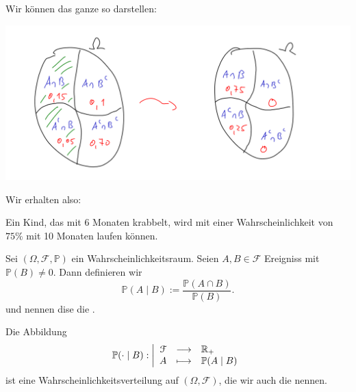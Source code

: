\begin{example}
    Wir können das ganze so darstellen: \\
    \begin{minipage}[t]{\textwidth}
        \centering
        \vspace{-2ex}
    \includegraphics[scale=0.2]{figures/Bedingte Wahrscheinlichkeit II.png}
    \vspace{2ex}
    \end{minipage}
    Wir erhalten also:
    \begin{answer}
        Ein Kind, das mit 6 Monaten krabbelt, wird mit einer Wahrscheinlichkeit von $75\%$ mit 10 Monaten laufen können.
    \end{answer}
\end{example}
\begin{definition}\label{def:bedingte-wahrscheinlichkeit}
    Sei $(\Omega, \mathcal{F}, \mathbb{P})$ ein Wahrscheinlichkeitsraum. Seien $A,B\in \mathcal{F}$ Ereigniss mit $\mathbb{P}(B) \neq  0$. Dann definieren wir
    \[
        \mathbb{P}(A \mid B) := \frac{\mathbb{P}(A\cap B)}{\mathbb{P}(B)}
    .\] 
    und nennen dise die . 
\end{definition}
\begin{remark}
       Die Abbildung
               \begin{equation*}
                   \mathbb{P}(\cdot \mid B): \left| \begin{array}{c c l} 
               \mathcal{F} & \longrightarrow & \mathbb{R}_+ \\
               A & \longmapsto &  \mathbb{P}(A\mid B)
               \end{array} \right.
           \end{equation*}
           ist eine Wahrscheinlichkeitsverteilung auf $(\Omega,\mathcal{F})$, die wir auch die  nennen.
\end{remark}
